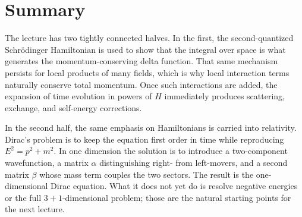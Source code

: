 \section{Summary}

The lecture has two tightly connected halves. In the first, the second-quantized Schr\"odinger Hamiltonian is used to show that the integral over space is what generates the momentum-conserving delta function. That same mechanism persists for local products of many fields, which is why local interaction terms naturally conserve total momentum. Once such interactions are added, the expansion of time evolution in powers of \(H\) immediately produces scattering, exchange, and self-energy corrections.

In the second half, the same emphasis on Hamiltonians is carried into relativity. Dirac's problem is to keep the equation first order in time while reproducing \(E^2=p^2+m^2\). In one dimension the solution is to introduce a two-component wavefunction, a matrix \(\alpha\) distinguishing right- from left-movers, and a second matrix \(\beta\) whose mass term couples the two sectors. The result is the one-dimensional Dirac equation. What it does not yet do is resolve negative energies or the full \(3+1\)-dimensional problem; those are the natural starting points for the next lecture.